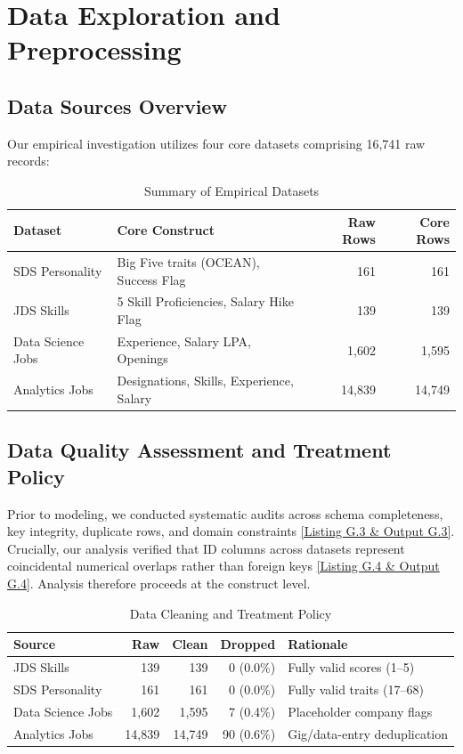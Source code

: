 \documentclass[conference]{IEEEtran}
\begin{document}
\section{Data Exploration and Preprocessing}
\label{sec:data_exploration}

\subsection{Data Sources Overview}

Our empirical investigation utilizes four core datasets comprising 16,741 raw records:
\begin{table}[!t]
\centering
\caption{Summary of Empirical Datasets}
\label{tab:datasets}
\footnotesize\begin{tabular}{@{}llrr@{}}
\toprule
\textbf{Dataset} & \textbf{Core Construct} & \textbf{Raw Rows} & \textbf{Core Rows} \\
\midrule
SDS Personality & Big Five traits (OCEAN), Success Flag & 161 & 161 \\
JDS Skills & 5 Skill Proficiencies, Salary Hike Flag & 139 & 139 \\
Data Science Jobs & Experience, Salary LPA, Openings & 1,602 & 1,595 \\
Analytics Jobs & Designations, Skills, Experience, Salary & 14,839 & 14,749 \\
\bottomrule
\end{tabular}
\end{table}

\subsection{Data Quality Assessment and Treatment Policy}
\label{sec:data_quality}\label{sec:treatment}

Prior to modeling, we conducted systematic audits across schema completeness, key integrity, duplicate rows, and domain constraints \hyperref[lst:audit]{[Listing G.3 \& Output G.3]}. Crucially, our analysis verified that ID columns across datasets represent coincidental numerical overlaps rather than foreign keys \hyperref[lst:domain]{[Listing G.4 \& Output G.4]}. Analysis therefore proceeds at the construct level.

\begin{table}[!t]
\centering
\caption{Data Cleaning and Treatment Policy}
\label{tab:cleaning_policy}
\footnotesize\begin{tabular}{@{}lrrrl@{}}
\toprule
\textbf{Source} & \textbf{Raw} & \textbf{Clean} & \textbf{Dropped} & \textbf{Rationale} \\
\midrule
JDS Skills & 139 & 139 & 0 (0.0\%) & Fully valid scores (1--5) \\
SDS Personality & 161 & 161 & 0 (0.0\%) & Fully valid traits (17--68) \\
Data Science Jobs & 1,602 & 1,595 & 7 (0.4\%) & Placeholder company flags \\
Analytics Jobs & 14,839 & 14,749 & 90 (0.6\%) & Gig/data-entry deduplication \\
\bottomrule
\end{tabular}
\end{table}
\end{document}
